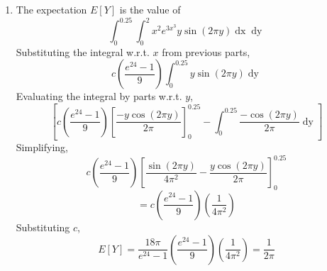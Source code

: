 \documentclass[a4paper]{article}
\begin{document}
\begin{enumerate}
\item The expectation $E[Y]$  is the value of
\begin{equation}
\int_0^{0.25}\int_0^2x^2e^{3x^3}y\sin\left(2\pi y\right)\mathop{dx}\mathop{dy}
\end{equation}
Substituting the integral w.r.t. $x$ from previous parts,
\begin{equation}
c\left(\frac{e^{24}-1}{9}\right)\int_0^{0.25}y\sin\left(2\pi y\right)\mathop{dy}
\end{equation}
Evaluating the integral by parts w.r.t. $y$,
\begin{equation}
\left[c\left(\frac{e^{24}-1}{9}\right)\left[\frac{-y\cos\left(2\pi y\right)}{2\pi}\right]_0^{0.25} -\int_0^{0.25}\frac{-\cos\left(2\pi y\right)}{2\pi}\mathop{dy}\right]
\end{equation}
Simplifying,
\begin{equation}
c\left(\frac{e^{24}-1}{9}\right)\left[\frac{\sin\left(2\pi y\right)}{4\pi^2}-\frac{y\cos\left(2\pi y\right)}{2\pi}\right]_0^{0.25}
\end{equation}
\begin{equation}
=c\left(\frac{e^{24}-1}{9}\right)\left(\frac{1}{4\pi^2}\right)
\end{equation}
Substituting $c$,
\begin{equation}
E[Y]=\frac{18\pi}{e^{24}-1}\left(\frac{e^{24}-1}{9}\right)\left(\frac{1}{4\pi^2}\right)=\frac{1}{2\pi}
\end{equation}
\end{enumerate}
\end{document}
